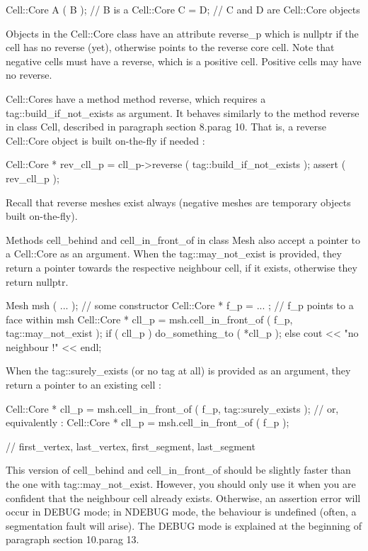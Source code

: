 \verbatim
   Cell::Core A ( B );  //  B is a Cell::Core
   C = D;  //  C and D are Cell::Core objects
\endverbatim

Objects in the {\codett Cell::Core} class have an attribute {\codett reverse\_p}
which is {\codett nullptr} if the cell has no reverse (yet), otherwise points to the
reverse core cell.
Note that negative cells must have a reverse, which is a positive cell.
Positive cells may have no reverse.

{\codett Cell::Core}s have a method method {\codett reverse}, which requires a
{\codett tag::build\_if\_not\_exists} as argument.
It behaves similarly to the method {\codett reverse} in class {\codett Cell},
described in paragraph \numb section 8.\numb parag 10.
That is, a reverse {\codett Cell::Core} object is built on-the-fly if needed :

\verbatim
   Cell::Core * rev_cll_p = cll_p->reverse ( tag::build_if_not_exists );
   assert ( rev_cll_p );
\endverbatim

Recall that reverse meshes exist always (negative meshes are temporary objects built
on-the-fly).

Methods {\codett cell\_behind} and {\codett cell\_in\_front\_of} in class {\codett Mesh}
also accept a pointer to a {\codett Cell::Core} as an argument.
When the {\codett tag::may\_not\_exist} is provided,
they return a pointer towards the respective neighbour cell, if it exists, otherwise
they return {\codett nullptr}.

\verbatim
   Mesh msh ( ... );  // some constructor
   Cell::Core * f_p = ... ;  //  f_p points to a face within msh
   Cell::Core * cll_p = msh.cell_in_front_of ( f_p, tag::may_not_exist );
   if ( cll_p ) do_something_to ( *cll_p );
   else cout << "no neighbour !" << endl;
\endverbatim

When the {\codett tag::surely\_exists} (or no tag at all) is provided as an argument,
they return a pointer to an existing cell :

\verbatim
   Cell::Core * cll_p = msh.cell_in_front_of ( f_p, tag::surely_exists );
   // or, equivalently :
   Cell::Core * cll_p = msh.cell_in_front_of ( f_p );

   // first_vertex, last_vertex, first_segment, last_segment
\endverbatim

This version of {\codett cell\_behind} and {\codett cell\_in\_front\_of} should be
slightly faster than the one with {\codett tag::may\_not\_exist}.
However, you should only use it when you are confident that the neighbour cell already
exists.
Otherwise, an {\codett assertion error} will occur in {\codett DEBUG} mode;
in {\codett NDEBUG} mode, the behaviour is undefined (often, a {\codett segmentation fault}
will arise).
The {\codett DEBUG} mode is explained at the beginning of paragraph \numb section
10.\numb parag 13.

